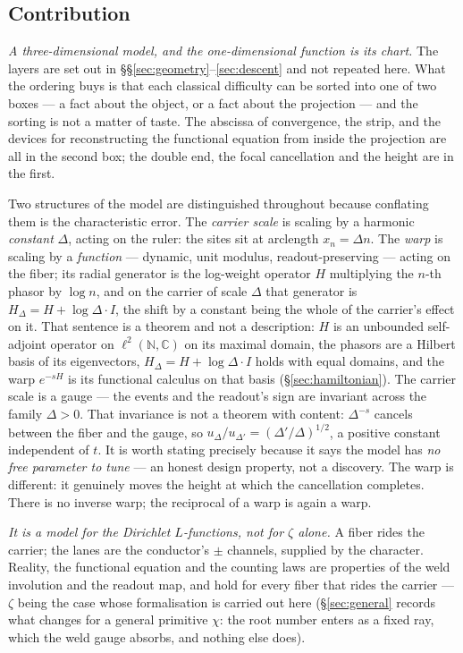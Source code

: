 \documentclass[11pt]{article}
\theoremstyle{plain}
\theoremstyle{definition}
\theoremstyle{remark}
\begin{document}
\subsection*{Contribution}\label{sec:contribution}
\emph{A three-dimensional model, and the one-dimensional function is its chart.} The
layers are set out in \S\S\ref{sec:geometry}--\ref{sec:descent} and not repeated here.
What the ordering buys is that each classical difficulty can be sorted into one of two
boxes --- a fact about the object, or a fact about the projection --- and the sorting is
not a matter of taste. The abscissa of convergence, the strip, and the devices for
reconstructing the functional equation from inside the projection are all in the second
box; the double end, the focal cancellation and the height are in the first.

Two structures of the model are distinguished throughout because conflating them is the
characteristic error. The \emph{carrier scale} is scaling by a harmonic
\emph{constant} $\Delta$, acting on the ruler: the sites sit at arclength
$x_n=\Delta n$. The \emph{warp} is scaling by a \emph{function} --- dynamic, unit
modulus, readout-preserving --- acting on the fiber; its radial generator is the
log-weight operator $H$ multiplying the $n$-th phasor by $\log n$, and on the carrier of
scale $\Delta$ that generator is $H_\Delta=H+\log\Delta\cdot I$, the shift by a constant
being the whole of the carrier's effect on it. That sentence is a theorem and not a
description: $H$ is an unbounded self-adjoint operator on $\ell^2(\mathbb N,\mathbb C)$
on its maximal domain, the phasors are a Hilbert basis of its eigenvectors,
$H_\Delta=H+\log\Delta\cdot I$ holds with equal domains, and the warp $e^{-sH}$ is its
functional calculus on that basis (\S\ref{sec:hamiltonian}). The carrier scale is a gauge --- the
events and the readout's sign are invariant across the family $\Delta>0$. That
invariance is not a theorem with content: $\Delta^{-s}$ cancels between the fiber and the
gauge, so $u_\Delta/u_{\Delta'}=(\Delta'/\Delta)^{1/2}$, a positive constant independent
of $t$. It is worth stating precisely because it says the model has \emph{no free
parameter to tune} --- an honest design property, not a discovery. The warp is different:
it genuinely moves the height at which the cancellation completes. There is no inverse warp; the reciprocal of
a warp is again a warp.

\emph{It is a model for the Dirichlet $L$-functions, not for $\zeta$ alone.} A fiber
rides the carrier; the lanes are the conductor's $\pm$ channels, supplied by the
character. Reality, the functional equation and the counting laws are properties of
the weld involution and the readout map, and hold for every fiber that rides the
carrier --- $\zeta$ being the case whose formalisation is carried out here
(\S\ref{sec:general} records what changes for a general primitive $\chi$: the root
number enters as a fixed ray, which the weld gauge absorbs, and nothing else does).
\end{document}
